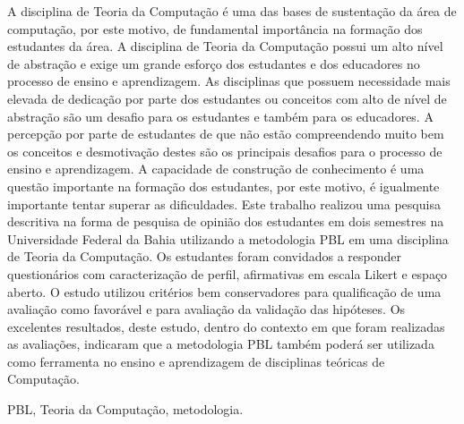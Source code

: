 \resumo
A disciplina de Teoria da Computação é uma das bases de
sustentação da área de computação, por este motivo, de
fundamental importância na formação dos estudantes
da área.
A disciplina de Teoria da Computação possui
um alto nível de abstração e exige um grande esforço
dos estudantes e dos educadores no processo de
ensino e aprendizagem.
As disciplinas que possuem necessidade mais elevada de dedicação
por parte dos estudantes ou conceitos com alto de nível de abstração
são um desafio para os estudantes e também para os educadores.
A percepção por parte de estudantes de
que não estão compreendendo muito bem os conceitos e
desmotivação destes são os principais desafios para o processo
de ensino e aprendizagem.
A capacidade de construção de conhecimento é uma
questão importante na formação dos estudantes, por este
motivo, é igualmente importante tentar superar as
dificuldades.
Este trabalho realizou uma pesquisa descritiva na forma
de pesquisa de opinião dos estudantes em dois semestres
na Universidade Federal da Bahia utilizando a
metodologia PBL em uma disciplina de Teoria da
Computação.
Os estudantes foram convidados a responder questionários com
caracterização de perfil, afirmativas em escala Likert e
espaço aberto.
O estudo utilizou critérios bem conservadores para qualificação
de uma avaliação como favorável e para avaliação da validação das
hipóteses.
Os excelentes resultados, deste estudo, dentro do contexto
em que foram realizadas as avaliações, indicaram que a
metodologia PBL também poderá ser utilizada como ferramenta
no ensino e aprendizagem de disciplinas teóricas
de Computação.

\begin{keywords}
PBL, Teoria da Computação, metodologia.
\end{keywords}
